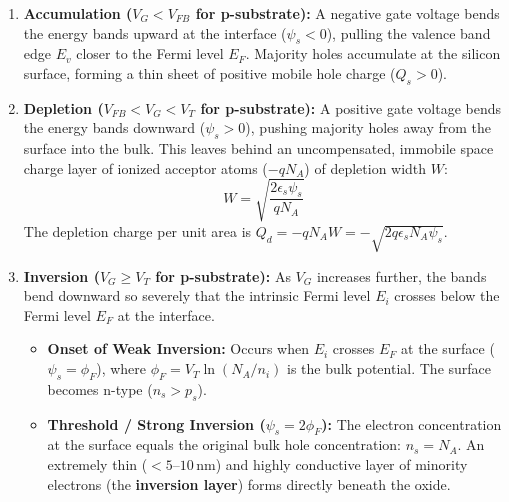 \documentclass[12pt,a4paper]{article}
\begin{document}
\begin{enumerate}[label=\arabic*., leftmargin=*]
  \item \textbf{Accumulation ($V_G < V_{FB}$ for p-substrate):}
  A negative gate voltage bends the energy bands upward at the interface ($\psi_s < 0$), pulling the valence band edge $E_v$ closer to the Fermi level $E_F$. Majority holes accumulate at the silicon surface, forming a thin sheet of positive mobile hole charge ($Q_s > 0$).

  \item \textbf{Depletion ($V_{FB} < V_G < V_T$ for p-substrate):}
  A positive gate voltage bends the energy bands downward ($\psi_s > 0$), pushing majority holes away from the surface into the bulk. This leaves behind an uncompensated, immobile space charge layer of ionized acceptor atoms ($-q N_A$) of depletion width $W$:
  \begin{equation}
    W = \sqrt{\frac{2 \epsilon_s \psi_s}{q N_A}}
  \end{equation}
  The depletion charge per unit area is $Q_d = -q N_A W = -\sqrt{2 q \epsilon_s N_A \psi_s}$.

  \item \textbf{Inversion ($V_G \ge V_T$ for p-substrate):}
  As $V_G$ increases further, the bands bend downward so severely that the intrinsic Fermi level $E_i$ crosses below the Fermi level $E_F$ at the interface.
  \begin{itemize}
    \item \textbf{Onset of Weak Inversion:} Occurs when $E_i$ crosses $E_F$ at the surface ($\psi_s = \phi_F$), where $\phi_F = V_T \ln(N_A / n_i)$ is the bulk potential. The surface becomes n-type ($n_s > p_s$).
    \item \textbf{Threshold / Strong Inversion ($\psi_s = 2\phi_F$):} The electron concentration at the surface equals the original bulk hole concentration: $n_s = N_A$. An extremely thin ($< 5\text{--}10\,\text{nm}$) and highly conductive layer of minority electrons (the \textbf{inversion layer}) forms directly beneath the oxide.
  \end{itemize}
\end{enumerate}
\end{document}
